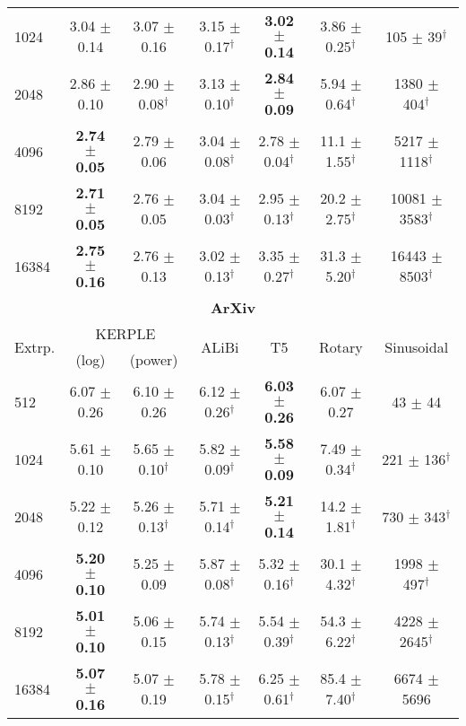 \begin{table}[!ht]
\begin{tabular}{@{\extracolsep{3pt}}lcccccc}
1024 & 3.04 $\pm$ 0.14 & 3.07 $\pm$ 0.16 & 3.15 $\pm$ 0.17$^\dagger$ & \textbf{3.02 $\pmb{\pm}$ 0.14} & 3.86 $\pm$ 0.25$^\dagger$ & 105 $\pm$ 39$^\dagger$\\
2048 & 2.86 $\pm$ 0.10 & 2.90 $\pm$ 0.08$^\dagger$ & 3.13 $\pm$ 0.10$^\dagger$ & \textbf{2.84 $\pmb{\pm}$ 0.09} & 5.94 $\pm$ 0.64$^\dagger$ & 1380 $\pm$ 404$^\dagger$\\
4096 & \textbf{2.74 $\pmb{\pm}$ 0.05} & 2.79 $\pm$ 0.06 & 3.04 $\pm$ 0.08$^\dagger$ & 2.78 $\pm$ 0.04$^\dagger$ & 11.1 $\pm$ 1.55$^\dagger$ & 5217 $\pm$ 1118$^\dagger$\\
8192 & \textbf{2.71 $\pmb{\pm}$ 0.05} & 2.76 $\pm$ 0.05 & 3.04 $\pm$ 0.03$^\dagger$ & 2.95 $\pm$ 0.13$^\dagger$ & 20.2 $\pm$ 2.75$^\dagger$ & 10081 $\pm$ 3583$^\dagger$\\
16384 & \textbf{2.75 $\pmb{\pm}$ 0.16} & 2.76 $\pm$ 0.13 & 3.02 $\pm$ 0.13$^\dagger$ & 3.35 $\pm$ 0.27$^\dagger$ & 31.3 $\pm$ 5.20$^\dagger$ & 16443 $\pm$ 8503$^\dagger$\\
    \hline\hline
    \multicolumn{7}{c}{\textbf{ArXiv}}\\
    \hline
    \multirow{2}{*}{Extrp.} & \multicolumn{2}{c}{KERPLE} & \multirow{2}{*}{ALiBi} & \multirow{2}{*}{T5} & \multirow{2}{*}{Rotary} & \multirow{2}{*}{Sinusoidal}\\
      \cline{2-3}
     &   (log) & (power) &  &  &  & \\ \hline
    512 & 6.07 $\pm$ 0.26 & 6.10 $\pm$ 0.26 & 6.12 $\pm$ 0.26$^\dagger$ & \textbf{6.03 $\pmb{\pm}$ 0.26} & 6.07 $\pm$ 0.27 & 43 $\pm$ 44\\
1024 & 5.61 $\pm$ 0.10 & 5.65 $\pm$ 0.10$^\dagger$ & 5.82 $\pm$ 0.09$^\dagger$ & \textbf{5.58 $\pmb{\pm}$ 0.09} & 7.49 $\pm$ 0.34$^\dagger$ & 221 $\pm$ 136$^\dagger$\\
2048 & 5.22 $\pm$ 0.12 & 5.26 $\pm$ 0.13$^\dagger$ & 5.71 $\pm$ 0.14$^\dagger$ & \textbf{5.21 $\pmb{\pm}$ 0.14} & 14.2 $\pm$ 1.81$^\dagger$ & 730 $\pm$ 343$^\dagger$\\
4096 & \textbf{5.20 $\pmb{\pm}$ 0.10} & 5.25 $\pm$ 0.09 & 5.87 $\pm$ 0.08$^\dagger$ & 5.32 $\pm$ 0.16$^\dagger$ & 30.1 $\pm$ 4.32$^\dagger$ & 1998 $\pm$ 497$^\dagger$\\
8192 & \textbf{5.01 $\pmb{\pm}$ 0.10} & 5.06 $\pm$ 0.15 & 5.74 $\pm$ 0.13$^\dagger$ & 5.54 $\pm$ 0.39$^\dagger$ & 54.3 $\pm$ 6.22$^\dagger$ & 4228 $\pm$ 2645$^\dagger$\\
16384 & \textbf{5.07 $\pmb{\pm}$ 0.16} & 5.07 $\pm$ 0.19 & 5.78 $\pm$ 0.15$^\dagger$ & 6.25 $\pm$ 0.61$^\dagger$ & 85.4 $\pm$ 7.40$^\dagger$ & 6674 $\pm$ 5696\\
    \hline\hline
    \end{tabular}
    \label{tab:openweb-github-arxiv}
\end{table}

